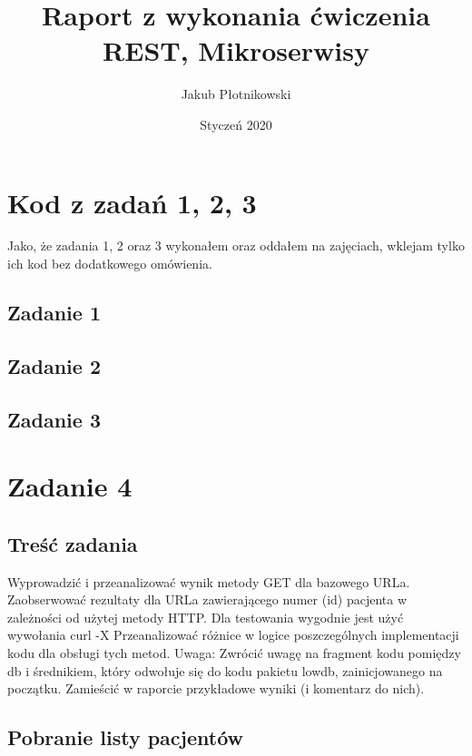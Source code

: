 \documentclass[a4paper, 11pt]{article}
\title{Raport z wykonania ćwiczenia REST, Mikroserwisy}
\author{Jakub Płotnikowski}
\date{Styczeń 2020}
\begin{document}
\maketitle
\tableofcontents

 \newpage 

\section{Kod z zadań 1, 2, 3}

Jako, że zadania 1, 2 oraz 3 wykonałem oraz oddałem na zajęciach, wklejam tylko ich kod bez dodatkowego omówienia.

 \subsection{Zadanie 1}
 
 
  \newpage 

 \subsection{Zadanie 2}
 
 
  \newpage 

 \subsection{Zadanie 3}
 
 
 \newpage 
 
 \section{Zadanie 4}
 
 \subsection{Treść zadania}
 Wyprowadzić i przeanalizować wynik metody GET dla bazowego URLa.
Zaobserwować rezultaty dla URLa zawierającego numer (id) pacjenta w zależności od użytej metody HTTP.
   Dla testowania wygodnie jest użyć wywołania curl -X
   Przeanalizować różnice w logice poszczególnych implementacji kodu dla obsługi tych metod.
Uwaga: Zwrócić uwagę na fragment kodu pomiędzy db i średnikiem, który odwołuje się do kodu pakietu lowdb, zainicjowanego na początku.
Zamieścić w raporcie przykładowe wyniki (i komentarz do nich).
 
 \subsection{Pobranie listy pacjentów}
 
 
\end{document}
